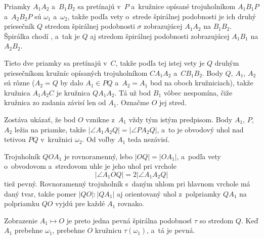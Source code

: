 %
{
    Priamky $A_1A_2$ a~$B_1B_2$ sa pretínajú v~$P$ a~kružnice opísané trojuholníkom $A_1B_1P$ a~$A_2B_2P$ sú $\omega_1$ a~$\omega_2$, takže podľa vety o~strede špirálnej podobnosti je ich druhý priesečník $Q$ stredom špirálnej podobnosti $\sigma$ zobrazujúcej $A_1A_2$ na $B_1B_2$. Špirálka chodí , a~tak je $Q$ aj stredom špirálnej podobnosti zobrazujúcej $A_1B_1$ na $A_2B_2$.

    Tieto dve priamky sa pretínajú v~$C$, takže podľa tej istej vety je $Q$ druhým priesečníkom kružníc opísaných trojuholníkom $CA_1A_2$ a~$CB_1B_2$. Body $Q$, $A_1$, $A_2$ sú rôzne ($A_2 = Q$ by dalo $A_1 \in PQ$ a~$A_2 = A_1$ bod na oboch kružniciach), takže kružnica $A_1A_2C$ je kružnica $QA_1A_2$. Tá už bod $B_1$ vôbec nespomína, čiže kružnica zo zadania závisí len od $A_1$. Označme $O$ jej stred.


    Zostáva ukázať, že bod $O$ vznikne z~$A_1$ vždy tým istým predpisom. Body $A_1$, $P$, $A_2$ ležia na priamke, takže $|\angle A_1A_2Q| = |\angle PA_2Q|$, a~to je obvodový uhol nad tetivou $PQ$ v~kružnici $\omega_2$. Od voľby $A_1$ teda nezávisí.

    Trojuholník $QOA_1$ je rovnoramenný, lebo $|OQ| = |OA_1|$, a~podľa vety o~obvodovom a~stredovom uhle je jeho uhol pri vrchole
    $$
    |\angle A_1OQ| = 2|\angle A_1A_2Q|
    $$
    tiež pevný. Rovnoramenný trojuholník s~daným uhlom pri hlavnom vrchole má daný tvar, takže pomer $|QO| : |QA_1|$ aj orientovaný uhol z~polpriamky $QA_1$ na polpriamku $QO$ vyjdú pre každé $A_1$ rovnako.

    Zobrazenie $A_1 \mapsto O$ je preto jedna pevná špirálna podobnosť $\tau$ so stredom $Q$. Keď $A_1$ prebehne $\omega_1$, prebehne $O$ kružnicu $\tau(\omega_1)$, a~tá je pevná.
}

